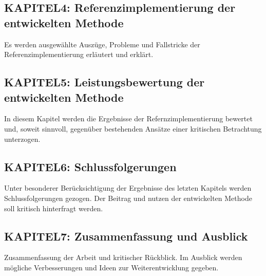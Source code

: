 		\subsection*{KAPITEL4: Referenzimplementierung der entwickelten Methode}
			Es werden ausgewählte Auszüge, Probleme und Fallstricke der Referenzimplementierung erläutert und erklärt. 


		\subsection*{KAPITEL5: Leistungsbewertung der entwickelten Methode}
			In diesem Kapitel werden die Ergebnisse der Refernzimplementierung bewertet und, soweit sinnvoll, gegenüber bestehenden Ansätze einer kritischen Betrachtung unterzogen. 


		\subsection*{KAPITEL6: Schlussfolgerungen}
			Unter besonderer Berücksichtigung der Ergebnisse des letzten Kapitels werden Schlussfolgerungen gezogen. 
			Der Beitrag und nutzen der entwickelten Methode soll kritisch hinterfragt werden.

		\subsection*{KAPITEL7: Zusammenfassung und Ausblick}
			Zusammenfassung der Arbeit und kritischer Rückblick. Im Ausblick werden mögliche Verbesserungen und Ideen zur Weiterentwicklung gegeben.  